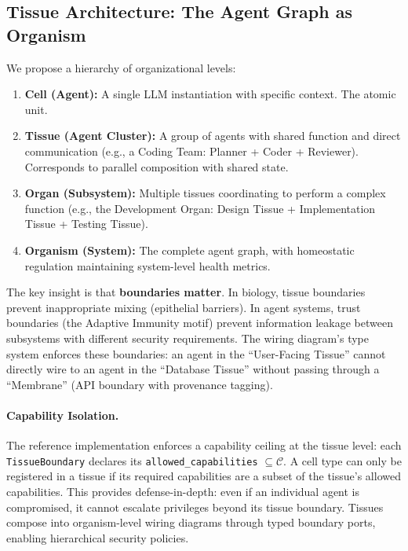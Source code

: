 \subsection{Tissue Architecture: The Agent Graph as Organism}

We propose a hierarchy of organizational levels:
\begin{enumerate}[leftmargin=*]
\item \textbf{Cell (Agent):} A single LLM instantiation with specific context. The atomic unit.
\item \textbf{Tissue (Agent Cluster):} A group of agents with shared function and direct communication
(e.g., a Coding Team: Planner + Coder + Reviewer). Corresponds to parallel composition with shared state.
\item \textbf{Organ (Subsystem):} Multiple tissues coordinating to perform a complex function
(e.g., the Development Organ: Design Tissue + Implementation Tissue + Testing Tissue).
\item \textbf{Organism (System):} The complete agent graph, with homeostatic regulation maintaining
system-level health metrics.
\end{enumerate}

The key insight is that \textbf{boundaries matter}. In biology, tissue boundaries prevent inappropriate mixing
(epithelial barriers). In agent systems, trust boundaries (the Adaptive Immunity motif) prevent information
leakage between subsystems with different security requirements. The wiring diagram's type system enforces
these boundaries: an agent in the ``User-Facing Tissue'' cannot directly wire to an agent in the ``Database
Tissue'' without passing through a ``Membrane'' (API boundary with provenance tagging).

\paragraph{Capability Isolation.}
The reference implementation enforces a capability ceiling at the tissue level: each \texttt{TissueBoundary} declares its \texttt{allowed\_capabilities} $\subseteq \mathcal{C}$. A cell type can only be registered in a tissue if its required capabilities are a subset of the tissue's allowed capabilities. This provides defense-in-depth: even if an individual agent is compromised, it cannot escalate privileges beyond its tissue boundary. Tissues compose into organism-level wiring diagrams through typed boundary ports, enabling hierarchical security policies.

